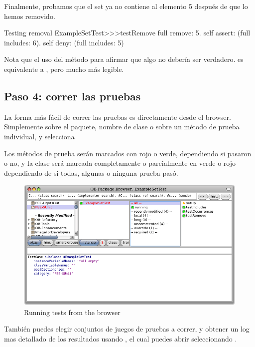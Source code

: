 \documentclass[a4paper,10pt,twoside]{book}
\begin{document}
Finalmente, probamos que el set ya no contiene al elemento 5 después de que lo hemos removido.

\begin{method}[testRemove]{Testing removal}
ExampleSetTest>>>testRemove
	full remove: 5.
	self assert: (full includes: 6).
	self deny: (full includes: 5)
\end{method}

\noindent
Nota que el uso del método  para afirmar que algo no debería ser 
 verdadero.
 es equivalente a , pero mucho más legible.
\subsection{Paso 4: correr las pruebas}

La forma más fácil de correr las pruebas es directamente desde el browser.
Simplemente \actclick sobre el paquete, nombre de clase o sobre un método de prueba individual, 
y selecciona 

Los métodos de prueba serán marcados con rojo o verde, dependiendo si pasaron o no, y la clase será marcada completamente o parcialmente en verde o rojo dependiendo de si todas, algunas o ninguna prueba pasó.

\begin{figure}[tbh]
  \begin{center}
	\includegraphics[width=\linewidth]{browser-tests}
	\caption{Running \sunit tests from the browser}
  \end{center}
\end{figure}

También puedes elegir conjuntos de juegos de pruebas a correr, y obtener un log mas detallado de los resultados
usando \sunit {}, el cual puedes abrir seleccionando .
\end{document}
